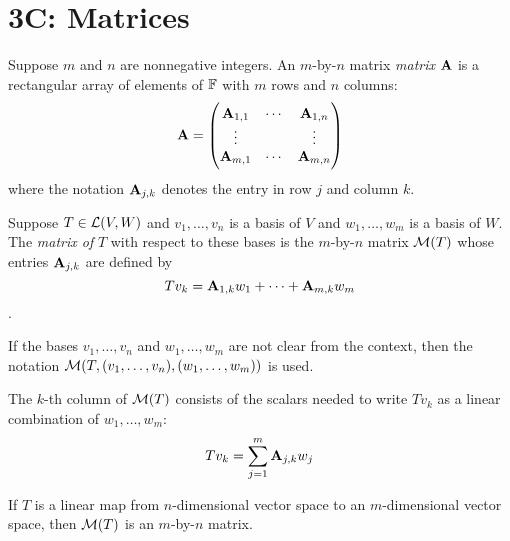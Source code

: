 \documentclass{extarticle}
\begin{document}




\newpage

\section*{3C: Matrices}

\begin{definition}[matrix, \(\Ab_{j,k}\)]
    Suppose \(m\) and \(n\) are nonnegative integers. An \(m\)-by-\(n\) matrix \emph{matrix}
    \(\mathbf{A}\) is a rectangular array of elements of \(\mathbb{F}\) with \(m\) rows and \(n\) columns:
    \[\mathbf{A} = \begin{pmatrix}
        \mathbf{A}_{1, 1} & \cdots & \mathbf{A}_{1, n} \\ 
        \vdots & & \vdots \\ 
        \mathbf{A}_{m, 1} & \cdots & \mathbf{A}_{m, n}
    \end{pmatrix}\]
where the notation \(\Ab_{j, k}\) denotes the entry in row \(j\) and column \(k\). 
\end{definition}

\begin{definition}
    Suppose \(T \in \mathcal{L}(V, W)\) and \(v_1, \ldots, v_n\) is a basis of \(V\) and \(w_1, \ldots, 
    w_m\) is a basis of \(W\). The \emph{matrix of} \(T\) with respect to these bases is the 
    \(m\)-by-\(n\) matrix \(\mathcal{M}(T)\) whose entries \(\Ab_{j,k}\) are defined by 
    \[T v_k = \mathbf{A}_{1, k} w_1 + \cdots + \mathbf{A}_{m, k} w_m\]. 

    If the bases \(v_1, \ldots, v_n\) and \(w_1, \ldots, w_m\) are not clear from the context, then 
    the notation \(\mathcal{M}(T, (v_1, \ldots, v_n), (w_1, \ldots, w_m))\) is used. 
\end{definition}

\begin{remark}
    The \(k\)-th column of \(\mathcal{M}(T)\) consists of the scalars needed to write \(T v_k\) 
    as a linear combination of \(w_1, \ldots, w_m\): 
    \[T v_k = \sum_{j=1}^{m} \mathbf{A}_{j, k} w_j\]
\end{remark}

\begin{remark}
    If \(T\) is a linear map from \(n\)-dimensional vector space to an \(m\)-dimensional vector 
    space, then \(\mathcal{M}(T)\) is an \(m\)-by-\(n\) matrix. 
\end{remark}
\end{document}
